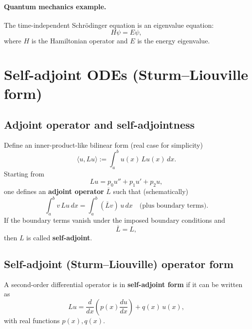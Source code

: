 \paragraph{Quantum mechanics example.}
The time-independent Schr\"odinger equation is an eigenvalue equation:
\begin{equation}
H\psi = E\psi,
\end{equation}
where $H$ is the Hamiltonian operator and $E$ is the energy eigenvalue.


\section{Self-adjoint ODEs (Sturm--Liouville form)}

\subsection{Adjoint operator and self-adjointness}
Define an inner-product-like bilinear form (real case for simplicity)
\begin{equation}
\langle u,Lu\rangle := \int_a^b u(x)\,Lu(x)\,dx.
\end{equation}
Starting from
\begin{equation}
Lu = p_0u'' + p_1u' + p_2u,
\end{equation}
one defines an \textbf{adjoint operator} $\overline{L}$ such that (schematically)
\begin{equation}
\int_a^b v\,Lu\,dx = \int_a^b (\overline{L}v)\,u\,dx
\quad \text{(plus boundary terms)}.
\end{equation}
If the boundary terms vanish under the imposed boundary conditions and
\begin{equation}
\overline{L} = L,
\end{equation}
then $L$ is called \textbf{self-adjoint}.

\subsection{Self-adjoint (Sturm--Liouville) operator form}
A second-order differential operator is in \textbf{self-adjoint form} if it can be written as
\begin{equation}
Lu = \frac{d}{dx}\!\left(p(x)\frac{du}{dx}\right) + q(x)\,u(x),
\end{equation}
with real functions $p(x),q(x)$.

